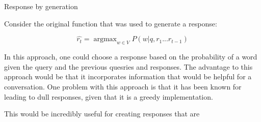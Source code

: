 \documentclass[10pt]{beamer}
\DeclareMathOperator*{\argmax}{argmax} %
\begin{document}
\begin{frame}{Response by generation}

Consider the original function that was used to generate a response:

\[
\hat{r_t} = \argmax_{w\in V} P(w|q, r_1...r_{t - 1})
\]

In this approach, one could choose a response based on the probability of a word given the query and the previous quesries and responses.  The advantage to this approach would be that it incorporates information that would be helpful for a conversation.  One problem with this approach is that it has been known for leading to dull responses, given that it is a greedy implementation.


This would be incredibly useful for creating responses that are 

\end{frame}
\end{document}
